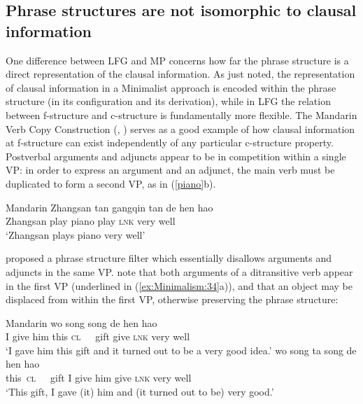 \documentclass[output=paper,hidelinks]{langscibook}
\begin{document}
\subsection{Phrase structures are not isomorphic to clausal
  information}

One difference between LFG and MP concerns how far the phrase
structure is a direct representation of the clausal information. As
just noted, the representation of clausal information in a Minimalist
approach is encoded within the phrase structure (in its configuration
and its derivation), while in LFG the relation between f-structure and
c-structure is fundamentally more flexible.  The Mandarin Verb Copy
Construction (\citealp{lithompson}, \citealp{huang82}) serves as a
good example of how clausal information at f-structure can exist
independently of any particular c-structure property. Postverbal
arguments and adjuncts appear to be in competition within a single VP:
in order to express an argument and an adjunct, the main verb must be
duplicated to form a second VP, as in (\ref{piano}b).

\ea\label{piano}Mandarin
\ex
\gll Zhangsan tan gangqin tan de hen hao\\
Zhangsan play piano play \textsc{lnk} very well\\
\glt `Zhangsan plays piano very well'
\z\z

\citet{huang82} proposed a phrase structure filter which essentially
disallows arguments and adjuncts in the same VP. \citet{fangsells07}
note that both arguments of a ditransitive verb appear in the first VP
(underlined in (\ref{ex:Minimalism:34}a)), and that an object may be displaced from
within the first VP, otherwise preserving the phrase structure:

\ea\label{ex:Minimalism:34} Mandarin
\ea
\gll wo   song   song  de hen
hao \\ 
I give him {this \textsc{cl}~~~gift} give \textsc{lnk} very well \\
\glt `I gave him this gift and it turned out to be a very good idea.'
\ex
\gll {} wo song   ta   {\gapline} song de  hen hao\\
{this\ \textsc{cl}~~~gift}   I give  him {\gapline} give   \textsc{lnk} 
  very well\\
\glt `This gift, I gave (it) him and (it turned out to be) very good.'
\z\z
\end{document}
